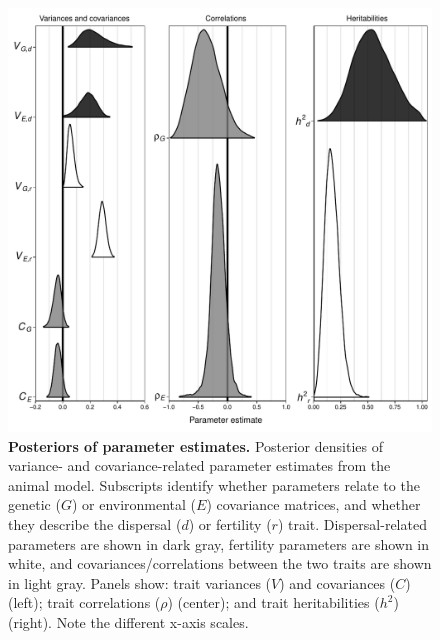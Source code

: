 \documentclass[11pt]{article}
\newcommand{\tom}[1]{{\textit{\color{WildStrawberry}{[#1]}}}}
\begin{document}

\newpage
\begin{figure}[h!]
\centering
\includegraphics[width=0.8\linewidth]{Figures/corr_posteriors.pdf}
\caption{\textbf{Posteriors of parameter estimates.} Posterior densities of variance- and covariance-related parameter estimates from the animal model. Subscripts identify whether parameters relate to the genetic ($G$) or environmental ($E$) covariance matrices, and whether they describe the dispersal ($d$) or fertility ($r$) trait. Dispersal-related parameters are shown in dark gray, fertility parameters are shown in white, and covariances/correlations between the two traits are shown in light gray. Panels show: trait variances ($V$) and covariances ($C$) (left); trait correlations ($\rho$) (center); and trait heritabilities ($h^{2}$) (right). Note the different x-axis scales.}\label{corr:posteriors}
\end{figure}
\end{document}

